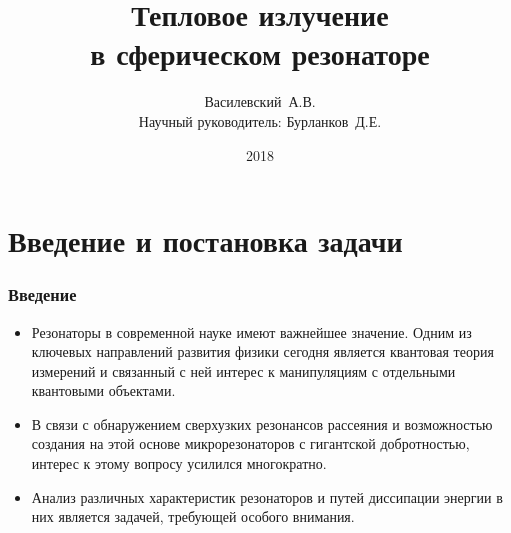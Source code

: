 \documentclass[compress]{beamer}
\title{Тепловое излучение\\ в сферическом резонаторе}
\author[Василевский~А.В.]{
    Василевский~А.В. \\[\baselineskip]
    {\footnotesize Научный руководитель: Бурланков~Д.Е.}
}
\institute[ННГУ]{Нижегородский университет им. Н.И.~Лобачевского}
\date{2018}
\begin{document}

    \frame[plain]{\titlepage}


    \section[Введение]{Введение и постановка задачи}


    \begin{frame}\frametitle{Введение}

        \begin{itemize}

            \item Резонаторы в современной науке имеют важнейшее значение. Одним из ключевых направлений развития физики сегодня является квантовая теория измерений и связанный с ней интерес к манипуляциям с отдельными квантовыми объектами.

            \item В связи с обнаружением сверхузких резонансов рассеяния и возможностью создания на этой основе микрорезонаторов с гигантской добротностью, интерес к этому вопросу усилился многократно.

            \item Анализ различных характеристик резонаторов и путей диссипации энергии в них является задачей, требующей особого внимания.

        \end{itemize}

    \end{frame}

\end{document}
